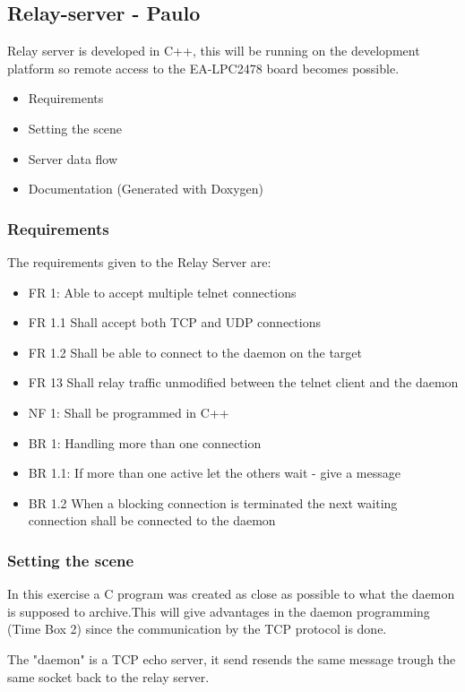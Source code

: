 \subsection{Relay-server - Paulo}
Relay server is developed in C++, this will be running on the development platform so remote access to the EA-LPC2478 board becomes possible.

\begin{itemize}
	\item Requirements
	\item Setting the scene
	\item Server data flow
	\item Documentation (Generated with Doxygen)
\end{itemize}

\subsubsection{Requirements}
The requirements given to the Relay Server are:

\begin{itemize}
	\item FR 1: Able to accept multiple telnet connections
	\item FR 1.1 Shall accept both TCP and UDP connections
 	\item FR 1.2 Shall be able to connect to the daemon on the target
 	\item FR 13 Shall relay traffic unmodified between the telnet client and the daemon
 	\item NF 1: Shall be programmed in C++
 	\item BR 1: Handling more than one connection
 	\item BR 1.1: If more than one active let the others wait - give a message
 	\item BR 1.2 When a blocking connection is terminated the next waiting connection shall be connected to the daemon
\end{itemize}

\subsubsection{Setting the scene}
In this exercise a C program was created as close as possible to what the daemon is supposed to archive.This will give advantages in the daemon programming (Time Box 2) since the communication by the TCP protocol is done.

The "daemon" is a TCP echo server, it send resends the same message trough the same socket back to the relay server.

